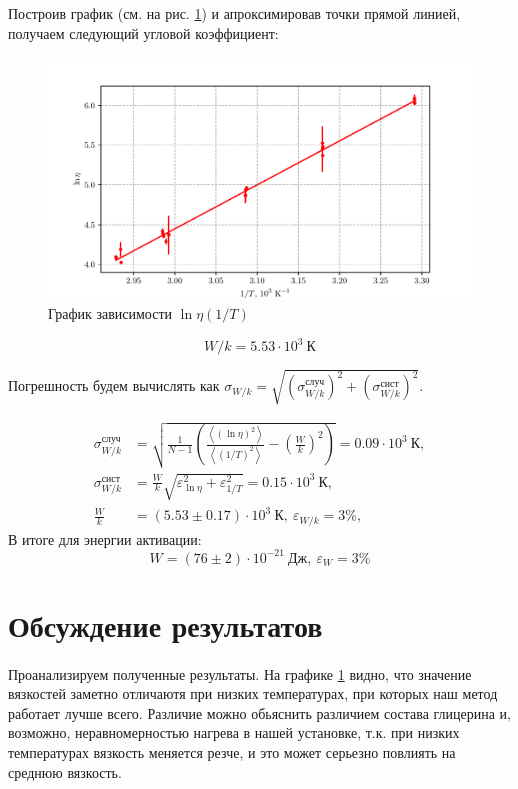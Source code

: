 \documentclass[a4paper, 12pt]{article}
\begin{document}
Построив график (см. на рис. \ref{graph}) и апроксимировав точки прямой линией,
получаем следующий угловой коэффициент:
\begin{figure}[H]
    \centering
    \includegraphics{data/graph.pdf}
    \caption{График зависимости $\ln\eta (1 / T)$}
    \label{graph}
\end{figure}

$$W/k = 5.53\cdot10^3\ \text{К} $$

Погрешность будем вычислять как $\sigma_{W/k} = \sqrt{(\sigma_{W/k}^{\text{случ}})^2 +
(\sigma_{W/k}^{\text{сист}})^2}$.

\begin{align*}
\sigma_{W/k}^{\text{случ}} & = \sqrt{\frac{1}{N -
 1}\left(\frac{\left<(\ln\eta)^2\right>}{\left<(1/T)^2\right>}
 - \left(\frac{W}{k}\right)^2 \right)} = 0.09\cdot10^3\ \text{К},\\
\sigma_{W/k}^{\text{сист}} & = \frac{W}{k}\sqrt{\varepsilon_{\ln\eta}^2
        + \varepsilon_{1/T}^2} = 0.15\cdot 10^3\ \text{К}, \\
\frac{W}{k} & = (5.53 \pm 0.17)\cdot 10^3\ \text{К},\ \varepsilon_{W/k} = 3\%,
\end{align*}
В итоге для энергии активации:
$$
W  = (76\pm 2)\cdot 10^{-21}\ \text{Дж},\ \varepsilon_W = 3\%
$$
\section{Обсуждение результатов}

\paragraph{} Проанализируем полученные результаты. На графике
\ref{graph} видно, что значение вязкостей заметно отличаютя при низких температурах, при
которых наш метод работает лучше всего. Различие можно обьяснить различием
состава глицерина и, возможно, неравномерностью нагрева в нашей установке, т.к.
при низких температурах вязкость меняется резче, и это
может серьезно повлиять на среднюю вязкость.  
\end{document}
